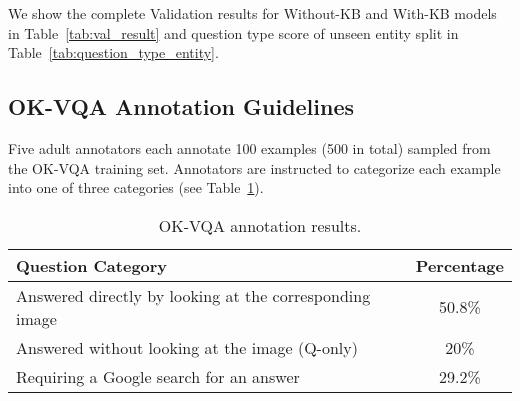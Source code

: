 \documentclass[11pt]{article}
\begin{document}
We show the complete Validation results for Without-KB and With-KB models in Table~\ref{tab:val_result} and question type score of unseen entity split in Table~\ref{tab:question_type_entity}.

\subsection{OK-VQA Annotation Guidelines}
\label{appendix:okvqa}
Five adult annotators each annotate 100 examples  (500 in total) sampled from the OK-VQA training set. Annotators are instructed to categorize each example into one of three categories (see Table~\ref{tab:okvqa}).

\begin{table}[h!]
\centering
\scriptsize
\begin{tabular}{lc}
\toprule
\textbf{Question Category} & \textbf{Percentage} \\
\midrule
Answered directly by looking at the corresponding image & 50.8\% \\
Answered without looking at the image (Q-only) & 20\% \\
Requiring a Google search for an answer & 29.2\% \\
\bottomrule
\end{tabular}
\caption{OK-VQA annotation results.}
\label{tab:okvqa}
\end{table}
 \label{sec:appendix}
\end{document}
